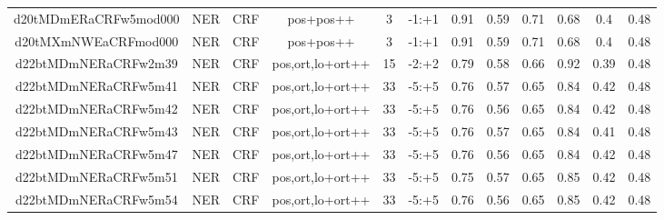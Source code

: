 \documentclass[a4paper]{article}
\begin{document}
\begin{landscape}
\begin{center}
\begin{tabular}{ |c|c|c|c|c|c|c|c|c|c|c|c|}
 	
 
 	
 		
 		\small{ d20tMDmERaCRFw5mod000 } & NER & CRF & pos+pos++  &  3 &  -1:+1  &  0.91 & 0.59 & 0.71  &  0.68 & 0.4 & 0.48 \\
 		

 	
 
 	
 		
 		\small{ d20tMXmNWEaCRFmod000 } & NER & CRF & pos+pos++  &  3 &  -1:+1  &  0.91 & 0.59 & 0.71  &  0.68 & 0.4 & 0.48 \\
 		

 	
 
 	
 		
 		\small{ d22btMDmNERaCRFw2m39 } & NER & CRF & pos,ort,lo+ort++  &  15 &  -2:+2  &  0.79 & 0.58 & 0.66  &  0.92 & 0.39 & 0.48 \\
 		

 	
 
 	
 		
 		\small{ d22btMDmNERaCRFw5m41 } & NER & CRF & pos,ort,lo+ort++  &  33 &  -5:+5  &  0.76 & 0.57 & 0.65  &  0.84 & 0.42 & 0.48 \\
 		

 	
 
 	
 		
 		\small{ d22btMDmNERaCRFw5m42 } & NER & CRF & pos,ort,lo+ort++  &  33 &  -5:+5  &  0.76 & 0.56 & 0.65  &  0.84 & 0.42 & 0.48 \\
 		

 	
 
 	
 		
 		\small{ d22btMDmNERaCRFw5m43 } & NER & CRF & pos,ort,lo+ort++  &  33 &  -5:+5  &  0.76 & 0.57 & 0.65  &  0.84 & 0.41 & 0.48 \\
 		

 	
 
 	
 		
 		\small{ d22btMDmNERaCRFw5m47 } & NER & CRF & pos,ort,lo+ort++  &  33 &  -5:+5  &  0.76 & 0.56 & 0.65  &  0.84 & 0.42 & 0.48 \\
 		

 	
 
 	
 		
 		\small{ d22btMDmNERaCRFw5m51 } & NER & CRF & pos,ort,lo+ort++  &  33 &  -5:+5  &  0.75 & 0.57 & 0.65  &  0.85 & 0.42 & 0.48 \\
 		

 	
 
 	
 		
 		\small{ d22btMDmNERaCRFw5m54 } & NER & CRF & pos,ort,lo+ort++  &  33 &  -5:+5  &  0.76 & 0.56 & 0.65  &  0.85 & 0.42 & 0.48 \\
 		


\end{tabular}
\end{center}
\end{landscape}
\end{document}
